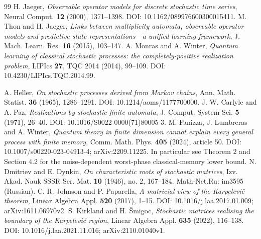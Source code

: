 \begin{thebibliography}{99}
 H. Jaeger, \emph{Observable operator models for discrete stochastic time series}, Neural Comput. \textbf{12} (2000), 1371--1398. DOI: 10.1162/089976600300015411.
 M. Thon and H. Jaeger, \emph{Links between multiplicity automata, observable operator models and predictive state representations---a unified learning framework}, J. Mach. Learn. Res. \textbf{16} (2015), 103--147.
 A. Monras and A. Winter, \emph{Quantum learning of classical stochastic processes: the completely-positive realization problem}, LIPIcs \textbf{27}, TQC 2014 (2014), 99--109. DOI: 10.4230/LIPIcs.TQC.2014.99.

 A. Heller, \emph{On stochastic processes derived from Markov chains}, Ann. Math. Statist. \textbf{36} (1965), 1286--1291. DOI: 10.1214/aoms/1177700000.
 J. W. Carlyle and A. Paz, \emph{Realizations by stochastic finite automata}, J. Comput. System Sci. \textbf{5} (1971), 26--40. DOI: 10.1016/S0022-0000(71)80005-3.
 M. Fanizza, J. Lumbreras and A. Winter, \emph{Quantum theory in finite dimension cannot explain every general process with finite memory}, Comm. Math. Phys. \textbf{405} (2024), article 50. DOI: 10.1007/s00220-023-04913-4; arXiv:2209.11225. In particular see Theorem 2 and Section 4.2 for the noise-dependent worst-phase classical-memory lower bound.
 N. Dmitriev and E. Dynkin, \emph{On characteristic roots of stochastic matrices}, Izv. Akad. Nauk SSSR Ser. Mat. \textbf{10} (1946), no. 2, 167--184. Math-Net.Ru: im3595 (Russian).
 C. R. Johnson and P. Paparella, \emph{A matricial view of the Karpelevi\v c theorem}, Linear Algebra Appl. \textbf{520} (2017), 1--15. DOI: 10.1016/j.laa.2017.01.009; arXiv:1611.06970v2.
 S. Kirkland and H. \v Smigoc, \emph{Stochastic matrices realising the boundary of the Karpelevi\v c region}, Linear Algebra Appl. \textbf{635} (2022), 116--138. DOI: 10.1016/j.laa.2021.11.016; arXiv:2110.01040v1.
\end{thebibliography}
